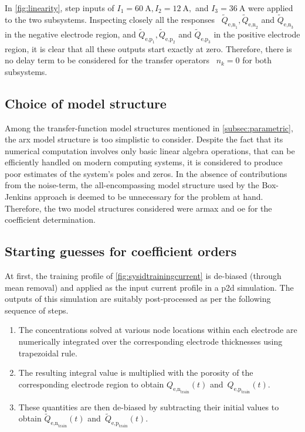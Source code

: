 In \cref{fig:linearity},   step  inputs   of   ${I_1   =  \SI{60}{\ampere},   I_2
=    \SI{12}{\ampere},}$   and    ${I_3   =    \SI{36}{\ampere}}$   were    applied
to    the   two    subsystems.    Inspecting   closely    all   the    responses
\ie~$\widetilde{Q}_{\text{e,n}_1},    \widetilde{Q}_{\text{e,n}_2}   $   and
$\widetilde{Q}_{\text{e,n}_3}$    in    the     negative    electrode    region,
and    $\widetilde{Q}_{\text{e,p}_1},    \widetilde{Q}_{\text{e,p}_2}   $    and
$\widetilde{Q}_{\text{e,p}_3}$  in the  positive electrode  region, it  is clear
that all these outputs start exactly at  zero. Therefore, there is no delay term
to be considered for the transfer operators \ie~${n_k = 0}$ for both subsystems.

\subsection{Choice of model structure}\label{subsec:modelstrucchoice}

Among      the      transfer-function       model      structures      mentioned
in \cref{subsec:parametric}, the \gls{arx} model  structure is too simplistic to
consider. Despite  the fact that  its numerical computation involves  only basic
linear algebra operations,  that can be efficiently handled  on modern computing
systems, it  is considered to produce  poor estimates of the  system's poles and
zeros. In the absence of contributions from the noise-term, the all-encompassing
model structure used by the Box-Jenkins approach is deemed to be unnecessary for
the  problem  at hand.  Therefore,  the  two  model structures  considered  were
\gls{armax} and \gls{oe} for the coefficient determination.

\subsection{Starting guesses for coefficient orders}\label{subsec:initguesscoefforder}

At first, the training profile of \cref{fig:sysidtrainingcurrent} is
de-biased (through mean removal) and applied as the input current profile in a \gls{p2d}
simulation. The outputs of this simulation are suitably post-processed as per
the following sequence of steps.
\begin{enumerate}
    \item The concentrations solved at various node locations within each
        electrode are numerically integrated over the corresponding electrode
        thicknesses using trapezoidal rule.
    \item The resulting integral value is multiplied with the porosity of the
        corresponding electrode region to obtain $Q_{\text{e,n}_\text{train}}(t)$ and~$Q_{\text{e,p}_\text{train}}(t)$.
    \item These quantities are then de-biased by subtracting their initial
        values to obtain $\widetilde{Q}_{\text{e,n}_\text{train}}(t)$ and~$\widetilde{Q}_{\text{e,p}_\text{train}}(t)$.
\end{enumerate}

